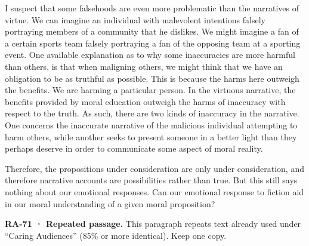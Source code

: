 \documentclass[
  letterpaper,
  DIV=11,
  numbers=noendperiod]{scrartcl}
\theoremstyle{remark}
\begin{document}
I suspect that some falsehoods are even more problematic than the
narratives of virtue. We can imagine an individual with malevolent
intentions falsely portraying members of a community that he dislikes.
We might imagine a fan of a certain sports team falsely portraying a fan
of the opposing team at a sporting event. One available explanation as
to why some inaccuracies are more harmful than others, is that when
maligning others, we might think that we have an obligation to be as
truthful as possible. This is because the harms here outweigh the
benefits. We are harming a particular person. In the virtuous narrative,
the benefits provided by moral education outweigh the harms of
inaccuracy with respect to the truth. As such, there are two kinds of
inaccuracy in the narrative. One concerns the inaccurate narrative of
the malicious individual attempting to harm others, while another seeks
to present someone in a better light than they perhaps deserve in order
to communicate some aspect of moral reality.

Therefore, the propositions under consideration are only under
consideration, and therefore narrative accounts are possibilities rather
than true. But this still says nothing about our emotional responses.
Can our emotional response to fiction aid in our moral understanding of
a given moral proposition?

\begin{tcolorbox}[enhanced jigsaw, arc=.35mm, bottomrule=.15mm, bottomtitle=1mm, breakable, colback=white, colbacktitle=quarto-callout-important-color!10!white, colframe=quarto-callout-important-color-frame, coltitle=black, left=2mm, leftrule=.75mm, opacityback=0, opacitybacktitle=0.6, rightrule=.15mm, title=\textcolor{quarto-callout-important-color}{\faExclamation}\hspace{0.5em}{Important}, titlerule=0mm, toprule=.15mm, toptitle=1mm]

\textbf{RA-71 · Repeated passage.} This paragraph repeats text already
used under ``Caring Audiences'' (85\% or more identical). Keep one copy.

\end{tcolorbox}
\end{document}
